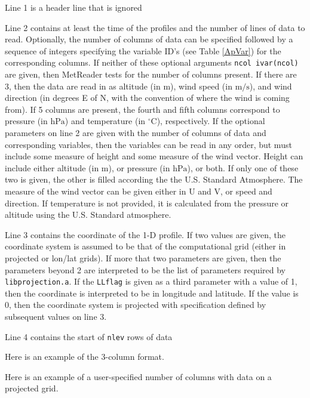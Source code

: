 \documentclass[11pt]{article}   %
\begin{document}
Line 1 is a header line that is ignored

Line 2 contains at least the time of the profiles and the number of lines of data
to read.  Optionally, the number of columns of data can be specified followed by 
a sequence of integers specifying the variable ID's (see Table \ref{ApVar}) for the corresponding
columns.  If neither of these optional arguments \texttt{ncol ivar(ncol)} are given,
then MetReader tests for the number of columns present.  If there are 3, then
the data are read in as altitude (in $\mathrm{m}$), wind speed (in $\mathrm{m/s}$), and 
wind direction (in degrees E of N, with the convention of where the wind is coming from).
If 5 columns are present, the fourth and fifth columns correspond to pressure (in $\mathrm{hPa}$)
and temperature (in $\mathrm{^{\circ}C}$), respectively.  If the optional parameters on line 2
are given with the number of columns of data and corresponding variables, then the variables
can be read in any order, but must include some measure of height and some measure of the 
wind vector.  Height can include either altitude (in $\mathrm{m}$), or pressure (in $\mathrm{hPa}$),
or both.  If only one of these two is given, the other is filled according the the U.S. Standard
Atmosphere.  The measure of the wind vector can be given either in U and V, or speed and direction.
If temperature is not provided, it is calculated from the pressure or altitude using the
U.S. Standard atmosphere.

Line 3 contains the coordinate of the 1-D profile.  If two values are given, the coordinate
system is assumed to be that of the computational grid (either in projected or lon/lat grids).
If more that two parameters are given, then the parameters beyond 2 are interpreted to be the list
of parameters required by \texttt{libprojection.a}.
If the \texttt{LLflag} is given as a third parameter with a value of 1, then the coordinate
is interpreted to be in longitude and latitude.  If the value is 0, then the coordinate system
is projected with specification defined by subsequent values on line 3.

Line 4 contains the start of \texttt{nlev} rows of data

Here is an example of the 3-column format.
\small  \normalsize

Here is an example of a user-specified number of columns with data on a 
projected grid.
\small  \normalsize
\end{document}
